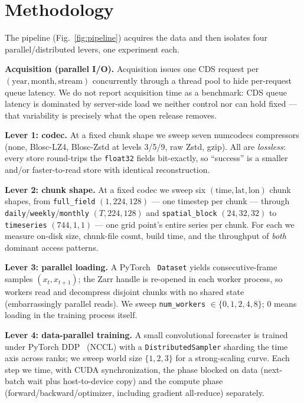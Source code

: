 \documentclass[conference]{IEEEtran}
\begin{document}
\section{Methodology}
The pipeline (Fig.~\ref{fig:pipeline}) acquires the data and then isolates
four parallel/distributed levers, one experiment each.

\textbf{Acquisition (parallel I/O).} Acquisition issues one CDS request per
$(\textrm{year},\textrm{month},\textrm{stream})$ concurrently through a thread
pool to hide per-request queue latency. We do not report acquisition time as a
benchmark: CDS queue latency is dominated by server-side load we neither
control nor can hold fixed --- that variability is precisely what the open
release removes.

\textbf{Lever 1: codec.} At a fixed chunk shape we sweep seven numcodecs
compressors (none, Blosc-LZ4, Blosc-Zstd at levels 3/5/9, raw Zstd, gzip).
All are \emph{lossless}: every store round-trips the \texttt{float32} fields
bit-exactly, so ``success'' is a smaller and/or faster-to-read store with
identical reconstruction.

\textbf{Lever 2: chunk shape.} At a fixed codec we sweep six
$(\textrm{time},\textrm{lat},\textrm{lon})$ chunk shapes, from
\texttt{full\_field} $(1,224,128)$ --- one timestep per chunk --- through
\texttt{daily}/\texttt{weekly}/\texttt{monthly} $(T,224,128)$ and
\texttt{spatial\_block} $(24,32,32)$ to \texttt{timeseries} $(744,1,1)$ ---
one grid point's entire series per chunk. For each we measure on-disk size,
chunk-file count, build time, and the throughput of \emph{both} dominant
access patterns.

\textbf{Lever 3: parallel loading.} A PyTorch~\cite{pytorch}
\texttt{Dataset} yields consecutive-frame samples $(x_t, x_{t+1})$; the Zarr
handle is re-opened in each worker process, so workers read and decompress
disjoint chunks with no shared state (embarrassingly parallel reads). We sweep
\texttt{num\_workers} $\in\{0,1,2,4,8\}$; 0 means loading in the training
process itself.

\textbf{Lever 4: data-parallel training.} A small convolutional forecaster is
trained under PyTorch DDP~\cite{ddp} (NCCL) with a
\texttt{DistributedSampler} sharding the time axis across ranks; we sweep
world size $\{1,2,3\}$ for a strong-scaling curve. Each step we time, with
CUDA synchronization, the phase blocked on data (next-batch wait plus
host-to-device copy) and the compute phase (forward/backward/optimizer,
including gradient all-reduce) separately.
\end{document}
